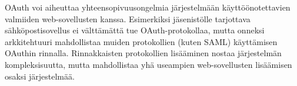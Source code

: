 OAuth voi aiheuttaa yhteensopivuusongelmia järjestelmään käyttöönotettavien valmiiden web-sovellusten kanssa. Esimerkiksi jäsenistölle tarjottava sähköpostisovellus ei välttämättä tue OAuth-protokollaa, mutta onneksi arkkitehtuuri mahdollistaa muiden protokollien (kuten SAML) käyttämisen OAuthin rinnalla. Rinnakkaisten protokollien lisääminen nostaa järjestelmän kompleksisuutta, mutta mahdollistaa yhä useampien web-sovellusten lisäämisen osaksi järjestelmää.